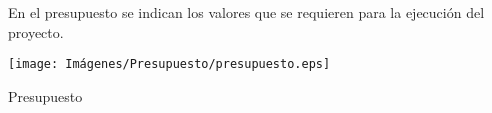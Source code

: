 En el presupuesto se indican los valores que se requieren para la ejecución del proyecto.

\begin{table}[h!]
    \begin{center}
    \centering
\texttt{[image: Imágenes/Presupuesto/presupuesto.eps]}
	\caption{Presupuesto}
    \end{center}
\end{table}
